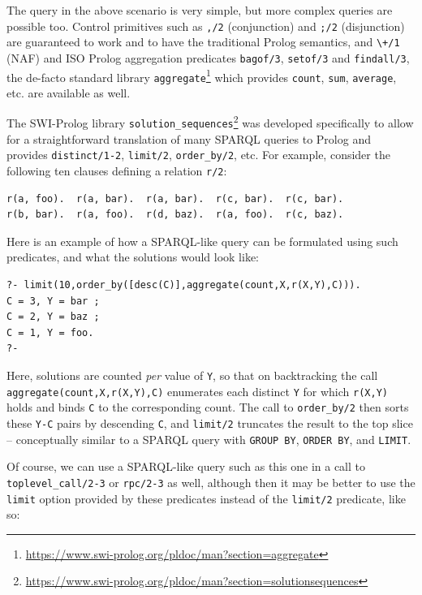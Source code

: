 The query in the above scenario is very simple, but more complex queries are possible too. Control primitives such as \texttt{,/2} (conjunction) and \texttt{;/2} (disjunction) are guaranteed to work and to have the traditional Prolog semantics, and  \verb|\+/1| (NAF) and ISO Prolog aggregation predicates \texttt{bagof/3}, \texttt{setof/3} and \texttt{findall/3}, the de-facto standard library \texttt{aggregate}\footnote{\url{https://www.swi-prolog.org/pldoc/man?section=aggregate}} which provides \texttt{count}, \texttt{sum}, \texttt{average}, etc. are available as well.

The SWI-Prolog library \texttt{solution\_sequences}\footnote{\url{https://www.swi-prolog.org/pldoc/man?section=solutionsequences}} was developed specifically to allow for a straightforward translation of many SPARQL queries to Prolog and provides \texttt{distinct/1-2}, \texttt{limit/2}, \texttt{order\_by/2}, etc. For example, consider the following ten clauses defining a relation \texttt{r/2}:

\begin{verbatim}
r(a, foo).  r(a, bar).  r(a, bar).  r(c, bar).  r(c, bar).
r(b, bar).  r(a, foo).  r(d, baz).  r(a, foo).  r(c, baz).     
\end{verbatim}

\noindent Here is an example of how a SPARQL-like query can be formulated using such predicates, and what the solutions would look like:

\begin{verbatim}
?- limit(10,order_by([desc(C)],aggregate(count,X,r(X,Y),C))).
C = 3, Y = bar ;
C = 2, Y = baz ;
C = 1, Y = foo.
?-
\end{verbatim}

\noindent Here, solutions are counted \emph{per} value of \texttt{Y}, so that on backtracking the call \texttt{aggregate(count,X,r(X,Y),C)} enumerates each distinct \texttt{Y} for which \texttt{r(X,Y)} holds and binds \texttt{C} to the corresponding count. The call to \texttt{order\_by/2} then sorts these \texttt{Y-C} pairs by descending \texttt{C}, and \texttt{limit/2} truncates the result to the top slice -- conceptually similar to a SPARQL query with \texttt{GROUP BY}, \texttt{ORDER BY}, and \texttt{LIMIT}.

Of course, we can use a SPARQL-like query such as this one in a call to \texttt{toplevel\_call/2-3} or \texttt{rpc/2-3} as well, although then it may be better to use the \texttt{limit} option provided by these predicates instead of the \texttt{limit/2} predicate, like so:

